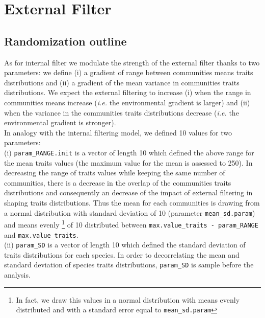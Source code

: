 \documentclass[12pt]{article}\usepackage[]{graphicx}\usepackage[]{color}
\begin{document}
\cleardoublepage

\section{External Filter}

 \subsection {Randomization outline}
 
As for internal filter we modulate the strength of the external filter thanks to two parameters:
we define (i) a gradient of range between communities means traits distributions and (ii) a gradient of the mean variance in communities traits distributions. We expect the external filtering to increase (i) when the range in communities means increase (\textit{i.e.} the environmental gradient is larger) and (ii) when the variance in the communities traits distributions decrease (\textit{i.e.} the environmental gradient is stronger).
\\

In analogy with the internal filtering model, we defined 10 values for two parameters:
\\

 (i) \texttt{param\_{}RANGE.init} is a vector of length 10 which defined the above range for the mean traits values (the maximum value for the mean is assessed to 250). In decreasing the range of traits values while keeping the same number of communities, there is a decrease in the overlap of the communities traits distributions and consequently an decrease of the impact of external filtering in shaping traits distributions. Thus the mean for each communities is drawing from a normal distribution with standard deviation of 10 (parameter \texttt{mean\_{}sd.param}) and means evenly
\footnote{In fact, we draw this values in a normal distribution with means evenly distributed and with a standard error equal to \texttt{mean\_{}sd.param}}
of 10 distributed between \texttt{max.value\_{}traits - param\_{}RANGE} and \texttt{max.value\_{}traits}.
\\

(ii) \texttt{param\_{}SD} is a vector of length 10 which defined the standard deviation of traits distributions for each species. In order to decorrelating the mean and standard deviation of species traits distributions, \texttt{param\_{}SD} is sample before the analysis. 
\\
\end{document}
